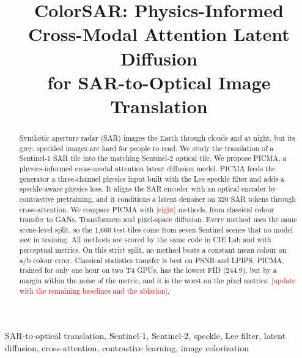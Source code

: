 \documentclass[conference]{IEEEtran}
\newcommand{\pend}[1]{\textcolor{red}{[#1]}}
\begin{document}
\title{ColorSAR: Physics-Informed Cross-Modal Attention Latent Diffusion\\
for SAR-to-Optical Image Translation}

\author{
\IEEEauthorblockN{\pend{Author 1}, \pend{Author 2}, \pend{Author 3}, \pend{Author 4}, \pend{Author 5}}
\IEEEauthorblockA{\pend{Department, Institute, City, Country}\\
\pend{emails}}
}

\maketitle

\begin{abstract}
Synthetic aperture radar (SAR) images the Earth through clouds and at night, but its grey,
speckled images are hard for people to read. We study the translation of a Sentinel-1 SAR
tile into the matching Sentinel-2 optical tile. We propose PICMA, a physics-informed
cross-modal attention latent diffusion model. PICMA feeds the generator a three-channel
physics input built with the Lee speckle filter and adds a speckle-aware physics loss. It
aligns the SAR encoder with an optical encoder by contrastive pretraining, and it conditions
a latent denoiser on 320 SAR tokens through cross-attention. We compare PICMA with
\pend{eight} methods, from classical colour transfer to GANs, Transformers and pixel-space
diffusion. Every method uses the same scene-level split, so the 1{,}660 test tiles come from
seven Sentinel scenes that no model saw in training. All methods are scored by the same code
in CIE Lab and with perceptual metrics. On this strict split, no method beats a constant
mean colour on a/b colour error. Classical statistics transfer is best on PSNR and LPIPS. PICMA, trained
for only one hour on two T4 GPUs, has the lowest FID (244.9), but by a margin within the
noise of the metric, and it is the worst on the pixel metrics.
\pend{update with the remaining baselines and the ablation}.
\end{abstract}

\begin{IEEEkeywords}
SAR-to-optical translation, Sentinel-1, Sentinel-2, speckle, Lee filter, latent diffusion,
cross-attention, contrastive learning, image colorization
\end{IEEEkeywords}

\end{document}
